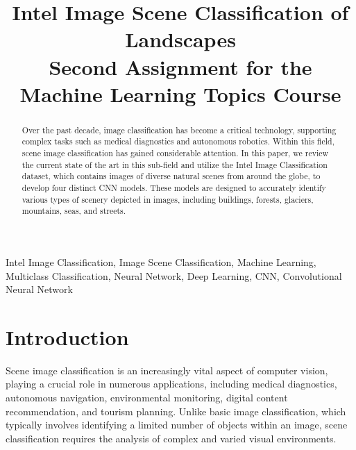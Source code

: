 \documentclass[conference]{IEEEtran}
\begin{document}
\title{Intel Image Scene Classification of Landscapes \\
{\footnotesize Second Assignment for the Machine Learning Topics Course}
}

\author{
\and
{}
}

\maketitle

\begin{abstract}

Over the past decade, image classification has become a critical technology, supporting complex tasks such as medical diagnostics and autonomous robotics. Within this field, scene image classification has gained considerable attention. In this paper, we review the current state of the art in this sub-field and utilize the Intel Image Classification dataset, which contains images of diverse natural scenes from around the globe, to develop four distinct CNN models. These models are designed to accurately identify various types of scenery depicted in images, including buildings, forests, glaciers, mountains, seas, and streets.

\end{abstract}

\begin{IEEEkeywords}
Intel Image Classification, Image Scene Classification, Machine Learning, Multiclass Classification, Neural Network, Deep Learning, CNN, Convolutional Neural Network
\end{IEEEkeywords}

\section{Introduction}

Scene image classification is an increasingly vital aspect of computer vision, playing a crucial role in numerous applications, including medical diagnostics, autonomous navigation, environmental monitoring, digital content recommendation, and tourism planning. Unlike basic image classification, which typically involves identifying a limited number of objects within an image, scene classification requires the analysis of complex and varied visual environments.
\end{document}
